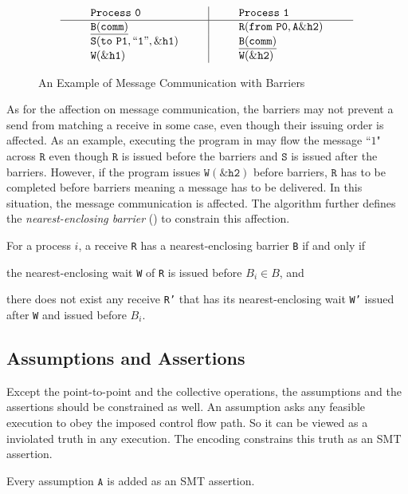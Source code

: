 \begin{figure}[h]
\[
\begin{array}{l|l}
\;\;\;\;\;\;\;\;\mathtt{Process\ 0}\;\;\;\;\;\;\;\; & \;\;\;\;\;\;\;\; \mathtt{Process\ 1}\;\;\;\;\;\;\;\; \\
\hline
\;\;\;\;\;\;\;\;\mathtt{\underline{B(comm)}}\;\;\;\;\;\;\;\; & \;\;\;\;\;\;\;\; \mathtt{R(from\ P0,A\&h2)}\;\;\;\;\;\;\;\; \\
\;\;\;\;\;\;\;\;\mathtt{S(to\ P1,``1",\&h1)}\;\;\;\;\;\;\;\; & \;\;\;\;\;\;\;\; \mathtt{\underline{B(comm)}}\;\;\;\;\;\;\;\; \\
\;\;\;\;\;\;\;\;\mathtt{W(\&h1)}\;\;\;\;\;\;\;\; & \;\;\;\;\;\;\;\; \mathtt{W(\&h2)}\;\;\;\;\;\;\;\; \\
\end{array}
\]
\caption{An Example of Message Communication with Barriers} \label{fig:mc_barrier1}
\end{figure}

As for the affection on message communication, the barriers may not prevent a send from matching a receive in some case, even though their issuing order is affected. As an example, executing the program in  may flow the message ``$1$" across $\mathtt{R}$ even though $\mathtt{R}$ is issued before the barriers and $\mathtt{S}$ is issued after the barriers. However, if the program issues $\mathtt{W(\&h2)}$ before barriers, $\mathtt{R}$ has to be completed before barriers meaning a message has to be delivered. In this situation, the message communication is affected. The algorithm further defines the \textit{nearest-enclosing barrier} () to constrain this affection.

\begin{definition}\label{def:nb}
For a process $i$, a receive \texttt{R} has a nearest-enclosing barrier \texttt{B} if and only if
\begin{compactenum}
\item the nearest-enclosing wait \texttt{W} of \texttt{R} is issued before $B_i\in B$, and
\item there does not exist any receive \texttt{R'} that has its nearest-enclosing wait \texttt{W'} issued after \texttt{W} and issued before $B_i$.
\end{compactenum}
\end{definition}


\subsection{Assumptions and Assertions}
Except the point-to-point and the collective operations, the assumptions and the assertions should be constrained as well. An assumption asks any feasible execution to obey the imposed control flow path. So it can be viewed as a inviolated truth in any execution. The encoding constrains this truth as an SMT assertion.
\begin{definition}[Assumption] \label{def:assm}
Every assumption $\mathtt{A}$ is added as an SMT assertion.
\end{definition}

